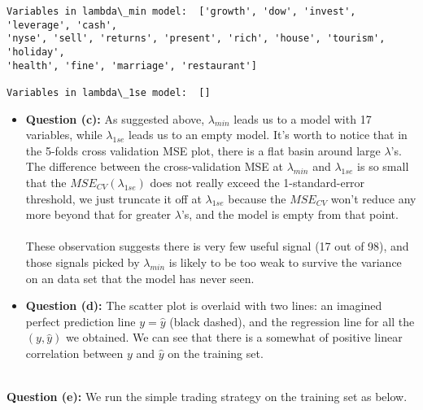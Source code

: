 \documentclass[11pt]{article}
\theoremstyle{definition}
\theoremstyle{hSol}
\begin{document}
    \begin{Verbatim}[commandchars=\\\{\}]
Variables in lambda\_min model:  ['growth', 'dow', 'invest', 'leverage', 'cash', 
'nyse', 'sell', 'returns', 'present', 'rich', 'house', 'tourism', 'holiday', 
'health', 'fine', 'marriage', 'restaurant'] 

Variables in lambda\_1se model:  []
    \end{Verbatim}
\begin{itemize}
    \item \textbf{Question (c):} As suggested above, $\lambda_{min}$ leads us to a model with 17 variables, while $\lambda_{1se}$ leads us to an empty model. It's worth to notice that in the 5-folds cross validation MSE plot, there is a flat basin around large $\lambda$'s. The difference between the cross-validation MSE at $\lambda_{min}$ and $\lambda_{1se}$ is so small that the $MSE_{CV}(\lambda_{1se})$ does not really exceed the 1-standard-error threshold, we just truncate it off at $\lambda_{1se}$ because the $MSE_{CV}$ won't reduce any more beyond that for greater $\lambda$'s, and the model is empty from that point.\\
    ~\\
    These observation suggests there is very few useful signal (17 out of 98), and those signals picked by $\lambda_{min}$ is likely to be too weak to survive the variance on an data set that the model has never seen.
    \item \textbf{Question (d):} The scatter plot is overlaid with two lines: an imagined perfect prediction line $y=\hat{y}$ (black dashed), and the regression line for all the $(y, \hat{y})$ we obtained. We can see that there is a somewhat of positive linear correlation between $y$ and $\hat{y}$ on the training set.  
\end{itemize}
~\\
\textbf{Question (e):} We run the simple trading strategy on the training set as below.
\end{document}
